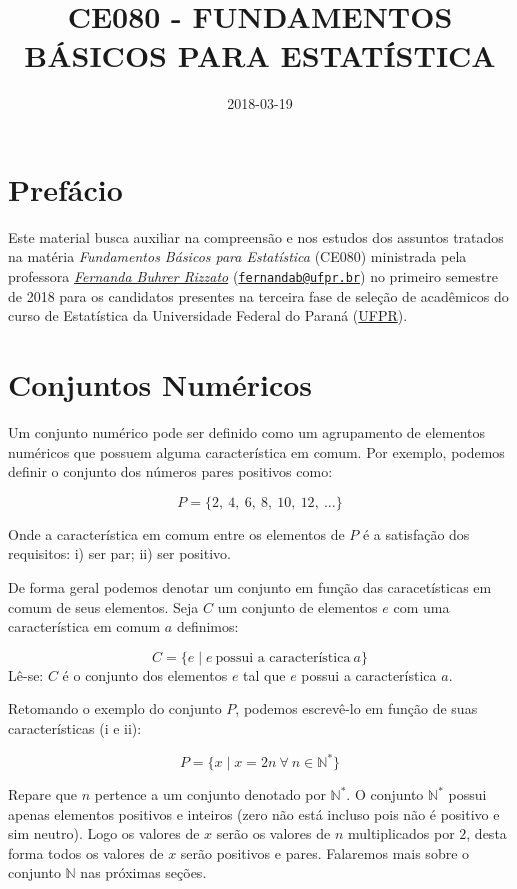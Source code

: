 \documentclass[]{book}
\title{CE080 - FUNDAMENTOS BÁSICOS PARA ESTATÍSTICA}
\author{}
\date{2018-03-19}
\begin{document}
\maketitle

{
\setcounter{tocdepth}{1}
\tableofcontents
}
\chapter*{Prefácio}\label{prefacio}

Este material busca auxiliar na compreensão e nos estudos dos assuntos
tratados na matéria \emph{Fundamentos Básicos para Estatística} (CE080)
ministrada pela professora
\href{http://leg.ufpr.br/doku.php/pessoais:fernanda}{\emph{Fernanda
Buhrer Rizzato}}
(\href{mailto:fernandab@ufpr.br}{\nolinkurl{fernandab@ufpr.br}}) no
primeiro semestre de 2018 para os candidatos presentes na terceira fase
de seleção de acadêmicos do curso de Estatística da Universidade Federal
do Paraná (\href{http://www.ufpr.br/}{UFPR}).

\chapter{Conjuntos Numéricos}\label{conjuntos-numericos}

Um conjunto numérico pode ser definido como um agrupamento de elementos
numéricos que possuem alguma característica em comum. Por exemplo,
podemos definir o conjunto dos números pares positivos como:

\[P = \{ 2,\ 4,\ 6,\ 8,\ 10,\ 12,\ ...\}\]

Onde a característica em comum entre os elementos de \(P\) é a
satisfação dos requisitos: i) ser par; ii) ser positivo.

De forma geral podemos denotar um conjunto em função das caracetísticas
em comum de seus elementos. Seja \(C\) um conjunto de elementos \(e\)
com uma característica em comum \(a\) definimos:

\[C = \{ e \mid e \ \text{possui a característica} \ a\}\] Lê-se: \(C\)
é o conjunto dos elementos \(e\) tal que \(e\) possui a característica
\(a\).

Retomando o exemplo do conjunto \(P\), podemos escrevê-lo em função de
suas características (i e ii):

\[P = \{x \mid x = 2n \ \forall \ n \in \mathbb{N}^{*} \}\]

Repare que \(n\) pertence a um conjunto denotado por \(\mathbb{N}^{*}\).
O conjunto \(\mathbb{N}^{*}\) possui apenas elementos positivos e
inteiros (zero não está incluso pois não é positivo e sim neutro). Logo
os valores de \(x\) serão os valores de \(n\) multiplicados por \(2\),
desta forma todos os valores de \(x\) serão positivos e pares. Falaremos
mais sobre o conjunto \(\mathbb{N}\) nas próximas seções.
\end{document}
